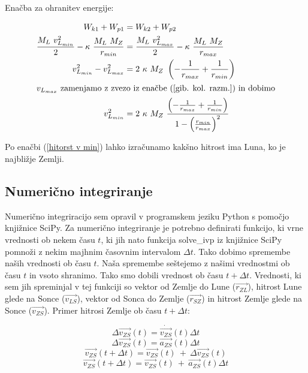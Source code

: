 \documentclass[titlepage,12pt,a4paper]{article}
\begin{document}
Enačba za ohranitev energije:
\begin{large}
\begin{align}
W_{k1} + W_{p1} &= W_{k2} + W_{p2}\\
\frac{M_L\ v_{L_{min}}^{2}}{2} - \kappa\ \frac{M_L\ M_Z}{r_{min}} &= \frac{M_L\ v_{L_{max}}^{2}}{2} - \kappa\ \frac{M_L\ M_Z}{r_{max}} \\
v_{L_{min}}^{2} - v_{L_{max}}^{2} &= 2\ \kappa\ M_Z\ \left(-\frac{1}{r_{max}} + \frac{1}{r_{min}} \right) \\
\intertext{$v_{L_{max}}$  zamenjamo z zvezo iz enačbe (\ref{gib. kol. razm.}) in dobimo} 
v_{L_{min}}^{2} &= 2\ \kappa\ M_Z\ \frac{\left(-\frac{1}{r_{max}} + \frac{1}{r_{min}} \right)}{1 - \left(\frac{r_{min}}{r_{max}}\right)^{2}} \label{hitorst v min}
\end{align}
\end{large}

Po enačbi (\ref{hitorst v min}) lahko izračunamo kakšno hitrost ima Luna, ko je najbližje Zemlji.

\subsection{Numerično integriranje}
Numerično integriracijo sem opravil v programskem jeziku Python s pomočjo knjižnice SciPy. Za numerično integriranje je potrebno definirati funkcijo, ki vrne vrednosti ob nekem času $t$, ki jih nato  funkcija solve\_ivp iz knjižnice SciPy pomnoži z nekim majhnim časovnim intervalom $\varDelta t$. Tako dobimo spremembe naših vrednosti ob času $t$. Naša spremembe seštejemo z našimi vrednostmi ob času $t$ in vsoto shranimo. Tako smo dobili vrednost ob času $t + \varDelta t$. Vrednosti, ki sem jih spreminjal v tej funkciji so vektor od Zemlje do Lune ($\overrightarrow{r_{ZL}}$), hitrost Lune glede na Sonce ($\overrightarrow{v_{LS}}$), vektor od Sonca do Zemlje ($\overrightarrow{r_{SZ}}$) in hitrost Zemlje glede na Sonce ($\overrightarrow{v_{ZS}}$). Primer hitrosi Zemlje ob času $t + \varDelta t$:

\begin{large}
$$\varDelta \overrightarrow{v_{ZS}}(t) = \dot{\overrightarrow{v_{ZS}}}(t) \varDelta t $$
$$\varDelta \overrightarrow{v_{ZS}}(t) = \overrightarrow{a_{ZS}}(t) \varDelta t$$
$$\overrightarrow{v_{ZS}}(t + \varDelta t) =  \overrightarrow{v_{ZS}}(t)\ +\ \varDelta\overrightarrow{v_{ZS}}(t)$$
$$\overrightarrow{v_{ZS}}(t + \varDelta t) =  \overrightarrow{v_{ZS}}(t)\ +\ \overrightarrow{a_{ZS}}(t) \varDelta t$$
\end{large}
\end{document}
